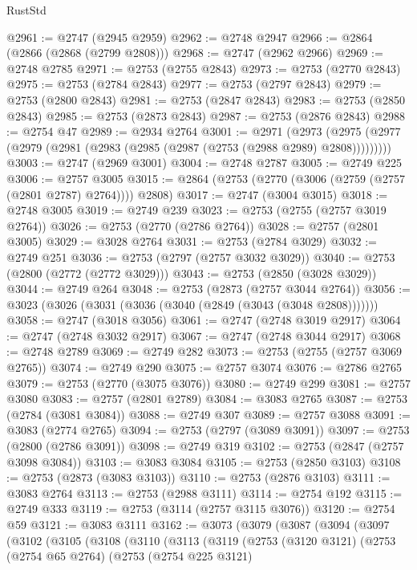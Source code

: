 \begin{lexlean}{RustStd}
\begin{coremodule}
@2961 := @2747 (@2945 @2959)
@2962 := @2748 @2947
@2966 := @2864 (@2866 (@2868 (@2799 @2808)))
@2968 := @2747 (@2962 @2966)
@2969 := @2748 @2785
@2971 := @2753 (@2755 @2843)
@2973 := @2753 (@2770 @2843)
@2975 := @2753 (@2784 @2843)
@2977 := @2753 (@2797 @2843)
@2979 := @2753 (@2800 @2843)
@2981 := @2753 (@2847 @2843)
@2983 := @2753 (@2850 @2843)
@2985 := @2753 (@2873 @2843)
@2987 := @2753 (@2876 @2843)
@2988 := @2754 @47
@2989 := @2934 @2764
@3001 := @2971
    (@2973 (@2975 (@2977 (@2979 (@2981 (@2983 (@2985 (@2987 (@2753 (@2988 @2989) @2808)))))))))
@3003 := @2747 (@2969 @3001)
@3004 := @2748 @2787
@3005 := @2749 @225
@3006 := @2757 @3005
@3015 := @2864 (@2753 (@2770 (@3006 (@2759 (@2757 (@2801 @2787) @2764)))) @2808)
@3017 := @2747 (@3004 @3015)
@3018 := @2748 @3005
@3019 := @2749 @239
@3023 := @2753 (@2755 (@2757 @3019 @2764))
@3026 := @2753 (@2770 (@2786 @2764))
@3028 := @2757 (@2801 @3005)
@3029 := @3028 @2764
@3031 := @2753 (@2784 @3029)
@3032 := @2749 @251
@3036 := @2753 (@2797 (@2757 @3032 @3029))
@3040 := @2753 (@2800 (@2772 (@2772 @3029)))
@3043 := @2753 (@2850 (@3028 @3029))
@3044 := @2749 @264
@3048 := @2753 (@2873 (@2757 @3044 @2764))
@3056 := @3023 (@3026 (@3031 (@3036 (@3040 (@2849 (@3043 (@3048 @2808)))))))
@3058 := @2747 (@3018 @3056)
@3061 := @2747 (@2748 @3019 @2917)
@3064 := @2747 (@2748 @3032 @2917)
@3067 := @2747 (@2748 @3044 @2917)
@3068 := @2748 @2789
@3069 := @2749 @282
@3073 := @2753 (@2755 (@2757 @3069 @2765))
@3074 := @2749 @290
@3075 := @2757 @3074
@3076 := @2786 @2765
@3079 := @2753 (@2770 (@3075 @3076))
@3080 := @2749 @299
@3081 := @2757 @3080
@3083 := @2757 (@2801 @2789)
@3084 := @3083 @2765
@3087 := @2753 (@2784 (@3081 @3084))
@3088 := @2749 @307
@3089 := @2757 @3088
@3091 := @3083 (@2774 @2765)
@3094 := @2753 (@2797 (@3089 @3091))
@3097 := @2753 (@2800 (@2786 @3091))
@3098 := @2749 @319
@3102 := @2753 (@2847 (@2757 @3098 @3084))
@3103 := @3083 @3084
@3105 := @2753 (@2850 @3103)
@3108 := @2753 (@2873 (@3083 @3103))
@3110 := @2753 (@2876 @3103)
@3111 := @3083 @2764
@3113 := @2753 (@2988 @3111)
@3114 := @2754 @192
@3115 := @2749 @333
@3119 := @2753 (@3114 (@2757 @3115 @3076))
@3120 := @2754 @59
@3121 := @3083 @3111
@3162 := @3073
    (@3079
      (@3087
        (@3094
          (@3097
            (@3102
              (@3105
                (@3108
                  (@3110
                    (@3113
                      (@3119
                        (@2753
                          (@3120 @3121)
                          (@2753
                            (@2754 @65 @2764)
                            (@2753
                              (@2754 @225 @3121)

\end{coremodule}
\end{lexlean}
